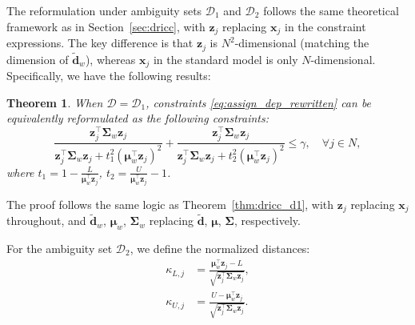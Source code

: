 \documentclass[preprint,12pt,authoryear]{elsarticle}
\newtheorem{theorem}{Theorem}
\begin{document}
The reformulation under ambiguity sets $\mathcal{D}_1$ and $\mathcal{D}_2$ follows the same theoretical framework as in Section~\ref{sec:dricc}, with $\mathbf{z}_j$ replacing $\mathbf{x}_j$ in the constraint expressions. The key difference is that $\mathbf{z}_j$ is $N^2$-dimensional (matching the dimension of $\widetilde{\mathbf{d}}_w$), whereas $\mathbf{x}_j$ in the standard model is only $N$-dimensional. Specifically, we have the following results:

\begin{theorem}\label{thm:assign_dep_d1}
When $\mathcal{D} = \mathcal{D}_1$, constraints \eqref{eq:assign_dep_rewritten} can be equivalently reformulated as the following constraints:
\begin{equation}
    \frac{\mathbf{z}_j^\top \boldsymbol{\Sigma}_w \mathbf{z}_j}{\mathbf{z}_j^\top \boldsymbol{\Sigma}_w \mathbf{z}_j + t_1^2 (\boldsymbol{\mu}_w^\top \mathbf{z}_j)^2} + \frac{\mathbf{z}_j^\top \boldsymbol{\Sigma}_w \mathbf{z}_j}{\mathbf{z}_j^\top \boldsymbol{\Sigma}_w \mathbf{z}_j + t_2^2 (\boldsymbol{\mu}_w^\top \mathbf{z}_j)^2} \leqslant \gamma, \quad \forall j \in N, \label{eq:assign_dep_d1_reform}
\end{equation}
where $t_1 = 1 - \frac{L}{\boldsymbol{\mu}_w^\top \mathbf{z}_j}$, $t_2 = \frac{U}{\boldsymbol{\mu}_w^\top \mathbf{z}_j} - 1$.
\end{theorem}

The proof follows the same logic as Theorem~\ref{thm:dricc_d1}, with $\mathbf{z}_j$ replacing $\mathbf{x}_j$ throughout, and $\widetilde{\mathbf{d}}_w$, $\boldsymbol{\mu}_w$, $\boldsymbol{\Sigma}_w$ replacing $\widetilde{\mathbf{d}}$, $\boldsymbol{\mu}$, $\boldsymbol{\Sigma}$, respectively.

For the ambiguity set $\mathcal{D}_2$, we define the normalized distances:
\begin{align}
\kappa_{L,j} &= \frac{\boldsymbol{\mu}_w^\top \mathbf{z}_j - L}{\sqrt{\mathbf{z}_j^\top \boldsymbol{\Sigma}_w \mathbf{z}_j}}, \\
\kappa_{U,j} &= \frac{U - \boldsymbol{\mu}_w^\top \mathbf{z}_j}{\sqrt{\mathbf{z}_j^\top \boldsymbol{\Sigma}_w \mathbf{z}_j}}.
\end{align}
\end{document}
